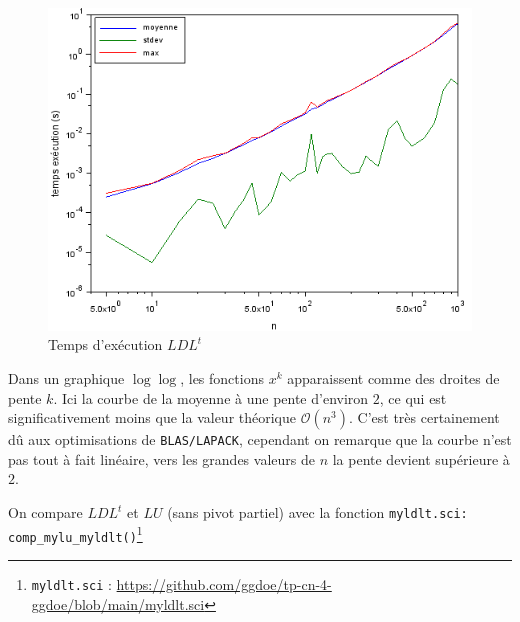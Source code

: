 \documentclass{article}
\begin{document}
\begin{figure}[H]
\caption{Temps d'exécution \(LDL^t\)}
\centering
\includegraphics[scale=0.80]{time_LDLt}
\end{figure}
Dans un graphique \(\log\log\), les fonctions \(x^k\) apparaissent comme des droites de pente \(k\). Ici la courbe de la moyenne à une pente d'environ \(2\), ce qui est significativement moins que la valeur théorique \(\mathcal{O}(n^3)\). C'est très certainement dû aux optimisations de \texttt{BLAS/LAPACK}, cependant on remarque que la courbe n'est pas tout à fait linéaire, vers les grandes valeurs de \(n\) la pente devient supérieure à \(2\).

On compare \(LDL^t\) et \(LU\) (sans pivot partiel) avec la fonction \texttt{myldlt.sci: comp\_mylu\_myldlt()}\footnote{\texttt{myldlt.sci} : \href{https://github.com/ggdoe/tp-cn-4-ggdoe/blob/main/myldlt.sci}{https://github.com/ggdoe/tp-cn-4-ggdoe/blob/main/myldlt.sci}}
\end{document}

